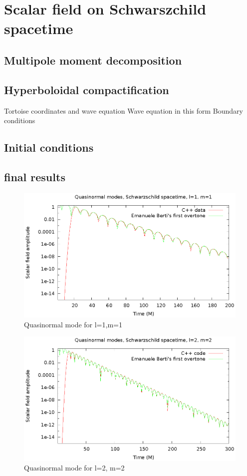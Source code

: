 \section{Scalar field on Schwarszchild spacetime}
\subsection{Multipole moment decomposition}
\subsection{Hyperboloidal compactification}
Tortoise coordinates and wave equation
Wave equation in this form
Boundary conditions
\subsection{Initial conditions}
\subsection{final results}


\begin{figure}
  \includegraphics{l1m1qnm}
  \caption{Quasinormal mode for l=1,m=1}
  \end{figure}

\begin{figure}
  \includegraphics{l2m2qnm}
  \caption{Quasinormal mode for l=2, m=2}
\end{figure}

